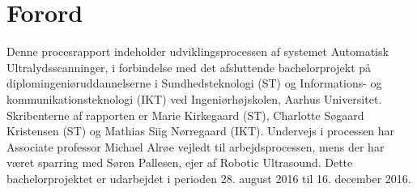 \chapter{Forord}\label{kapForord}
Denne procesrapport indeholder udviklingsprocessen af systemet Automatisk Ultralydsscanninger, i forbindelse med det afsluttende bachelorprojekt på diplomingeniøruddannelserne i Sundhedsteknologi (ST) og Informations- og kommunikationsteknologi (IKT) ved Ingeniørhøjskolen, Aarhus Universitet. Skribenterne af rapporten er Marie Kirkegaard (ST), Charlotte Søgaard Kristensen (ST) og Mathias Siig Nørregaard (IKT). Undervejs i processen har Associate professor Michael Alrøe vejledt til arbejdsprocessen, mens der har været sparring med Søren Pallesen, ejer af Robotic Ultrasound. Dette bachelorprojektet er udarbejdet i perioden 28. august 2016 til 16. december 2016.
